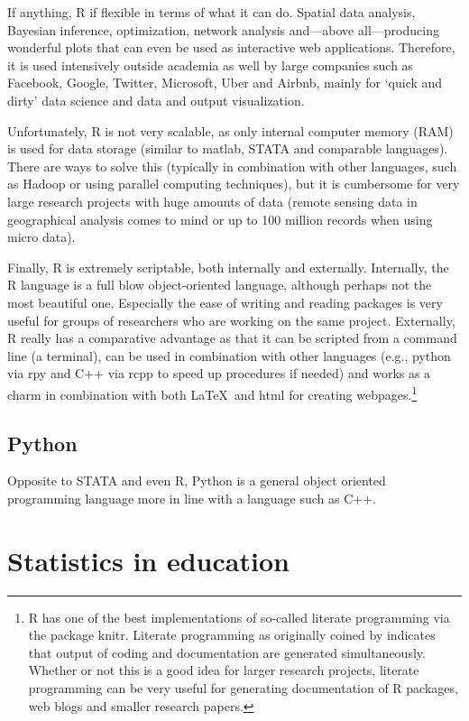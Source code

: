 \documentclass[fleqn,10pt]{SelfArx} %
\begin{document}
If anything, R if flexible in terms of what it can do. Spatial data analysis, Bayesian inference, optimization, network analysis and---above all---producing wonderful plots that can even be used as interactive web applications. Therefore, it is used intensively outside academia as well by large companies such as Facebook, Google, Twitter, Microsoft, Uber and Airbnb, mainly for `quick and dirty' data science and data and output visualization.

Unfortunately, R is not very scalable, as only internal computer memory (RAM) is used for data storage (similar to matlab, STATA and comparable languages). There are ways to solve this (typically in combination with other languages, such as Hadoop or using parallel computing techniques), but it is cumbersome for very large research projects with huge amounts of data (remote sensing data in geographical analysis comes to mind or up to 100 million records when using micro data).

Finally, R is extremely scriptable, both internally and externally. Internally, the R language is a full blow object-oriented language, although perhaps not the most beautiful one. Especially the ease of writing and reading packages is very useful for groups of researchers who are working on the same project. Externally, R really has a comparative advantage as that it can be scripted from a command line (a terminal), can be used in combination with other languages (e.g., python via rpy and C++ via rcpp to speed up procedures if needed) and works as a charm in combination with both \LaTeX\ and html for creating webpages.\footnote{R has one of the best implementations of so-called literate programming via the package knitr. Literate programming as originally coined by \citet{knuth1984literate} indicates that output of coding and documentation are generated simultaneously. Whether or not this is a good idea for larger research projects, literate programming can be very useful for generating documentation of R packages, web blogs and smaller research papers.}

\subsection*{Python}

Opposite to STATA and even R, Python is a general object oriented programming language more in line with a language such as C++. 

\section*{Statistics in education}
\end{document}
